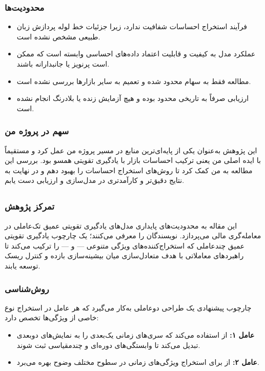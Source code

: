 \documentclass[12pt, a4paper]{report}
\begin{document}
\subsubsection{محدودیت‌ها}
\begin{itemize}
    \item فرآیند استخراج احساسات شفافیت ندارد، زیرا جزئیات خط لوله پردازش زبان طبیعی مشخص نشده است.  
    \item عملکرد مدل به کیفیت و قابلیت اعتماد داده‌های احساسی وابسته است که ممکن است پرنویز یا جانبدارانه باشند.  
    \item مطالعه فقط به سهام  محدود شده و تعمیم به سایر بازارها بررسی نشده است.  
    \item ارزیابی صرفاً به  تاریخی محدود بوده و هیچ آزمایش زنده یا بلادرنگ انجام نشده است.  
\end{itemize}

\subsubsection{سهم در پروژه من}
این پژوهش به‌عنوان یکی از پایه‌ای‌ترین منابع در مسیر پروژه من عمل کرد و مستقیماً با ایده اصلی من یعنی ترکیب احساسات بازار با یادگیری تقویتی همسو بود. بررسی این مطالعه به من کمک کرد تا روش‌های استخراج احساسات را بهبود دهم و در نهایت به نتایج دقیق‌تر و کارآمدتری در مدل‌سازی و ارزیابی دست یابم.



\subsection{ \cite{huang2023timesnet}}

\subsubsection{تمرکز پژوهش}
این مقاله به محدودیت‌های پایداری مدل‌های یادگیری تقویتی عمیق تک‌عاملی در معامله‌گری مالی می‌پردازد. نویسندگان  را معرفی می‌کنند؛ یک چارچوب یادگیری تقویتی عمیق چندعاملی که استخراج‌کننده‌های ویژگی متنوعی —  و  — را ترکیب می‌کند تا راهبردهای معاملاتی با هدف متعادل‌سازی میان بیشینه‌سازی بازده و کنترل ریسک توسعه یابند.  

\subsubsection{روش‌شناسی}
چارچوب پیشنهادی یک طراحی دو‌عاملی به‌کار می‌گیرد که هر عامل در استخراج نوع خاصی از ویژگی‌ها تخصص دارد:
\begin{itemize}
    \item \textbf{عامل ۱:} از  استفاده می‌کند که سری‌های زمانی یک‌بعدی را به نمایش‌های دوبعدی تبدیل می‌کند تا وابستگی‌های دوره‌ای و چندمقیاسی ثبت شوند.  
    \item \textbf{عامل ۲:} از  برای استخراج ویژگی‌های زمانی در سطوح مختلف وضوح بهره می‌برد.  
\end{itemize}
\end{document}
